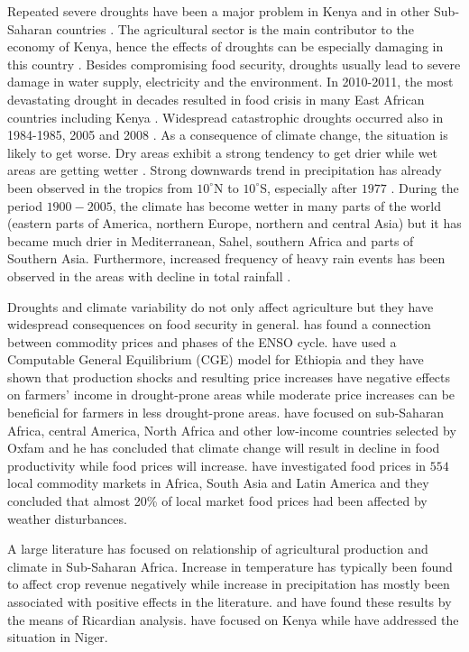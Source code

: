 \documentclass[a4paper,12pt]{article}
\begin{document}
Repeated severe droughts have been a major problem in Kenya and in other Sub-Saharan countries \citep{Compendium, WorldBank2015, Nicholson2017}. The agricultural sector is the main contributor to the economy of Kenya, hence the effects of droughts can be especially damaging in this country \citep{MendelsohnDinar2000}. Besides compromising food security, droughts usually lead to severe damage in water supply, electricity and the environment. In 2010-2011, the most devastating drought in decades resulted in food crisis in many East African countries including Kenya \citep{Chen2015}. Widespread catastrophic droughts occurred also in 1984-1985, 2005 and 2008 \citep{Hastenrath2007, Hastenrath2010, Hastenrath2011, Chen2015}.  As a consequence of climate change, the situation is likely to get worse. Dry areas exhibit a strong tendency to get drier while wet areas are getting wetter \citep{Trenberth2014, Chen2015, Kabubo2015}. Strong downwards trend in precipitation has already been observed in the tropics from $10^\circ$N to $10^\circ$S, especially after $1977$ \citep{IPCCtrenberth}. During the period $1900-2005$, the climate has become wetter in many parts of the world (eastern parts of America, northern Europe, northern and central Asia) but it has became much drier in Mediterranean, Sahel, southern Africa and parts of Southern Asia. Furthermore, increased frequency of heavy rain events has been observed in the areas with decline in total rainfall \citep{IPCCtrenberth}. 

Droughts and climate variability do not only affect agriculture but they have widespread consequences on food security in general. \cite{Ubilava2018} has found a connection between commodity prices and phases of the ENSO cycle. \cite{robinson2010} have used a Computable General Equilibrium (CGE) model for Ethiopia and they have shown that production shocks and resulting price increases have negative effects on farmers' income in drought-prone areas while moderate price increases can be beneficial for farmers in less drought-prone areas. \cite{OxfamIDS} have focused on sub-Saharan Africa, central America, North Africa and other low-income countries selected by Oxfam and he has concluded that climate change will result in decline in food productivity while food prices will increase. \cite{BROWN2015} have investigated food prices in $554$ local commodity markets in Africa, South Asia and Latin America and they concluded that almost 20\% of local market food prices had been affected by weather disturbances.

A large literature has focused on relationship of agricultural production and climate in Sub-Saharan Africa. Increase in temperature has typically been found to affect crop revenue negatively while increase in precipitation has mostly been associated with positive effects in the literature.  \cite{RicardianBello} and  \cite{Ochieng2016} have found these results by the means of Ricardian analysis. \cite{Ochieng2016} have focused on Kenya while \cite{RicardianBello} have addressed the situation in Niger. 
\end{document}
